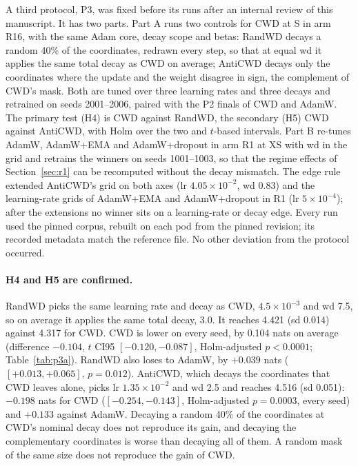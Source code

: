 \documentclass[twoside,11pt]{article}
\begin{document}
A third protocol, P3, was fixed before its runs after an internal review of this manuscript. It has two parts. Part A runs two controls for CWD at S in arm R16, with the same Adam core, decay scope and betas: RandWD decays a random 40\% of the coordinates, redrawn every step, so that at equal wd it applies the same total decay as CWD on average; AntiCWD decays only the coordinates where the update and the weight disagree in sign, the complement of CWD's mask. Both are tuned over three learning rates and three decays and retrained on seeds 2001--2006, paired with the P2 finals of CWD and AdamW. The primary test (H4) is CWD against RandWD, the secondary (H5) CWD against AntiCWD, with Holm over the two and $t$-based intervals. Part B re-tunes AdamW, AdamW+EMA and AdamW+dropout in arm R1 at XS with wd in the grid and retrains the winners on seeds 1001--1003, so that the regime effects of Section~\ref{sec:r1} can be recomputed without the decay mismatch.
The edge rule extended AntiCWD's grid on both axes (lr $4.05\times10^{-2}$, wd 0.83) and the learning-rate grids of AdamW+EMA and AdamW+dropout in R1 (lr $5\times10^{-4}$); after the extensions no winner sits on a learning-rate or decay edge. Every run used the pinned corpus, rebuilt on each pod from the pinned revision; its recorded metadata match the reference file. No other deviation from the protocol occurred.

\begin{table}[t]
\centering
\footnotesize
\resizebox{\textwidth}{!}{}
\caption{Protocol P3, part A: mask controls for CWD at S in arm R16, final seeds 2001--2006. CWD and AdamW are the P2 finals on the same seeds. Total decay is wd times the fraction of decayed coordinates: the mean sign-agreement fraction for CWD (0.40), 0.40 by construction for RandWD, one minus the agreement fraction measured under AntiCWD ($1 - 0.38 = 0.62$). Test loss means in nats; the difference is CWD $-$ method, paired over seeds, with its $t$-based CI95, the bootstrap CI95 and the two-sided paired $t$-test, Holm-corrected over H4 and H5.}
\label{tab:p3a}
\end{table}

\paragraph{H4 and H5 are confirmed.} RandWD picks the same learning rate and decay as CWD, $4.5\times10^{-3}$ and wd 7.5, so on average it applies the same total decay, 3.0. It reaches 4.421 (sd 0.014) against 4.317 for CWD. CWD is lower on every seed, by 0.104 nats on average (difference $-0.104$, $t$ CI95 $[-0.120, -0.087]$, Holm-adjusted $p < 0.0001$; Table~\ref{tab:p3a}). RandWD also loses to AdamW, by $+0.039$ nats ($[+0.013, +0.065]$, $p = 0.012$). AntiCWD, which decays the coordinates that CWD leaves alone, picks lr $1.35\times10^{-2}$ and wd 2.5 and reaches 4.516 (sd 0.051): $-0.198$ nats for CWD ($[-0.254, -0.143]$, Holm-adjusted $p = 0.0003$, every seed) and $+0.133$ against AdamW. Decaying a random 40\% of the coordinates at CWD's nominal decay does not reproduce its gain, and decaying the complementary coordinates is worse than decaying all of them. A random mask of the same size does not reproduce the gain of CWD.
\end{document}
